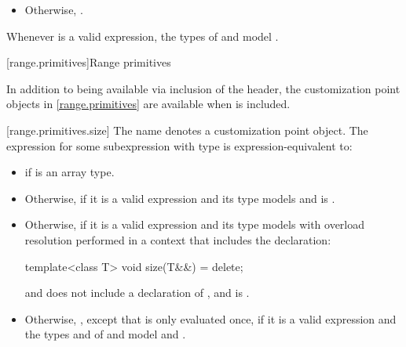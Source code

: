 \begin{addedblock}
\begin{itemize}
\item Otherwise, .
\end{itemize}

\pnum
\begin{note}
Whenever  is a valid expression, the
types of  and 
model .
\end{note}

[range.primitives]{Range primitives}

\pnum
In addition to being available via inclusion of the  header,
the customization point objects in \ref{range.primitives} are available
when  is included.

[range.primitives.size]{}
\pnum
The name  denotes a customization point
object. The expression
 for some subexpression  with type
 is expression-equivalent to:

\begin{itemize}
\item
   if  is an array
  type.

\item
  Otherwise, 
  if it is a valid expression and its type  models
   and
  is .

\item
  Otherwise, 
  if it is a valid expression and its type  models
   with overload resolution
  performed in a context that includes the declaration:
  \begin{codeblock}
  template<class T> void size(T&&) = delete;
  \end{codeblock}
  and does not include a declaration of , and
   is .

\item
  Otherwise,
  ,
  except that  is only evaluated once, if it is a valid expression and
  the types  and  of  and
   model
   and
  .


\end{itemize}
\end{addedblock}

